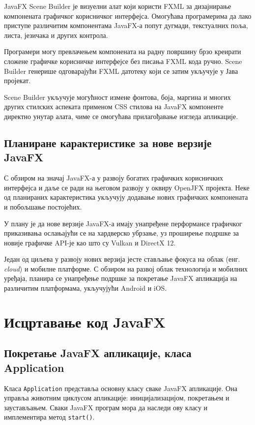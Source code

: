 JavaFX Scene Builder је визуелни алат који користи FXML за дизајнирање компонената графичког корисничког интерфејса. Омогућава програмерима да лако приступе различитим компонентама JavaFX-а попут дугмади, текстуалних поља, листа, језичака и других контрола.

Програмери могу превлачењем компонената на радну површину брзо креирати сложене графичке корисничке интерфејсе без писања FXML кода ручно. Scene Builder генерише одговарајући FXML датотеку који се затим укључује у Јава пројекат.

Scene Builder укључује могућност измене фонтова, боја, маргина и многих других стилских аспеката применом CSS стилова на JavaFX компоненте директно унутар алата, чиме се омогућава прилагођавање изгледа апликације.


\subsection{Планиране карактеристике за нове верзије JavaFX}

С обзиром на значај JavaFX-а у развоју богатих графичких корисничких интерфејса и даље се ради на његовом развоју у оквиру OpenJFX пројекта. Неке од планираних карактеристика укључују додавање нових графичких компонената и побољшање постојећих.

У плану је да нове верзије JavaFX-а имају унапређене перформансе графичког приказивања ослањајући се на хардверско убрзање, уз проширење подршке за новије графичке API-је као што су Vulkan и DirectX 12.

Један од циљева у развоју нових верзија јесте стављање фокуса на облак (енг. \textit{cloud}) и мобилне платформе. С обзиром на развој облак технологија и мобилних уређаја, планира се унапређење подршке за покретање JavaFX апликација на различитим платформама, укључујући Android и iOS.

\section{Исцртавање код JavaFX}

\subsection{Покретање JavaFX апликације, класа Application}

Класа \texttt{Application} представља основну класу сваке JavaFX апликације. Она управља животним циклусом апликације: иницијализацијом, покретањем и заустављањем. Сваки JavaFX програм мора да наследи ову класу и имплементира метод \texttt{start()}.

